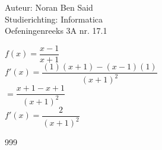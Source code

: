 \documentclass[a4paper]{article}
\begin{document}
  
\noindent \large Auteur: Noran Ben Said \\
\noindent \large Studierichting: Informatica\\
\noindent \large Oefeningenreeks 3A nr. 17.1\\

\medskip

\normalsize
$f(x) = \dfrac{x-1}{x+1}$\\

$ f'(x) = \dfrac{(1)(x+1) - (x-1)(1)}{(x+1)^2} $ \\

$ = \dfrac{x + 1 - x + 1}{(x+1)^2} $ \\

$f'(x) = \dfrac{2}{(x+1)^2}$\\


\begin{thebibliography}{999}
\end{thebibliography}
\end{document}
